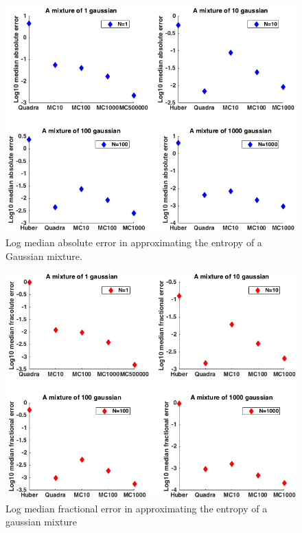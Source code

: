 \documentclass[a4paper,11pt]{report}
\begin{document}
\begin{figure} [H]
\label{fig:fig_medi_abs_err}
	\centering
	 \includegraphics[width=0.7\linewidth]{Log_median_absolute_error.png}
\caption{ Log median absolute error in approximating the entropy of a Gaussian mixture.}
\end{figure}

\begin{figure} [H]
\label{fig:fig_medi_frac_err}
	\centering
 	\includegraphics[width=0.7\linewidth]{Log_median_frac_error.png}
\caption{ Log median fractional error in approximating the entropy of a gaussian mixture }
\end{figure}
\end{document}
